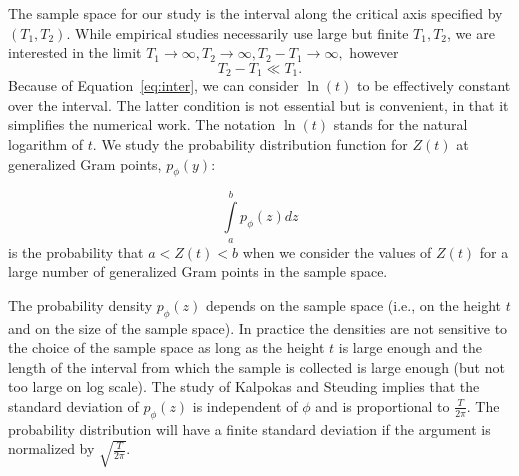 \documentclass[twoside]{article}
\begin{document}
The sample space for our study is the interval along the critical axis specified by $(T_1, T_2)$. 
While empirical studies necessarily use large but finite  $T_1, T_2$, we are interested in the limit 
$T_1 \rightarrow \infty, T_2 \rightarrow \infty,  T_2-T_1 \rightarrow \infty,$ however
\begin{equation}
T_2 - T_1  \ll T_1. 
\label{eq:inter}
\end{equation}
Because of Equation~\ref{eq:inter}, we can consider  $\ln (t)$  to be effectively constant over  the interval.
The latter condition is not essential but is convenient, in that it simplifies the numerical work. 
The notation $\ln (t)$ stands for the natural logarithm of $t$.  
We study the probability distribution function for $Z(t)$ at generalized Gram  points,
 $p_{\phi}(y)$:
\begin{definition}\label{pphi}
\begin{equation}
\int\limits_{a}^{b} p_{\phi}(z)dz
\label{eq:pdfphi}
\end{equation}
is the probability that $a<Z(t)<b$ when we consider the values of $Z(t)$ for a large number of 
generalized Gram points in the sample space. 
\end{definition}
The probability density  $p_{\phi}(z)$ depends on the sample space (i.e., on the height $t$ and on the size of 
the sample space). In practice the densities are not sensitive to the choice of the sample space as long as 
the height $t$ is large enough and the length of the interval from which the sample is collected is large enough 
(but not too large on log scale). The  study of 
Kalpokas and Steuding \cite{kalpokas 2009} implies that the standard deviation of $p_{\phi}(z)$  
is independent of $\phi$ and is proportional to $\frac{T}{2\pi}$.  
The probability distribution will have a finite standard deviation if the 
argument is normalized by $\sqrt{\frac{T}{2\pi}}$.
\end{document}
